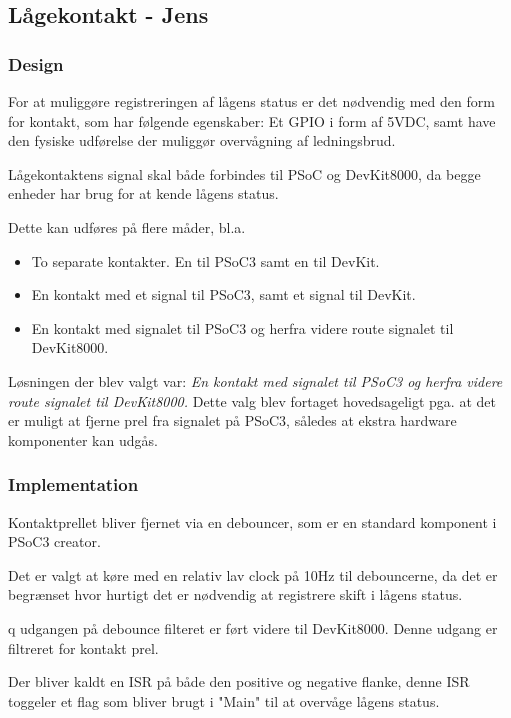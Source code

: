 \subsection{Lågekontakt - Jens}
\subsubsection{Design}

For at muliggøre registreringen af lågens status er det nødvendig med den form for kontakt, som har følgende egenskaber: Et GPIO i form af 5VDC, samt have den fysiske udførelse der muliggør overvågning af ledningsbrud.

Lågekontaktens signal skal både forbindes til PSoC og DevKit8000, da begge enheder har brug for at kende lågens status.

Dette kan udføres på flere måder, bl.a.
\begin{itemize}
 \item To separate kontakter. En til PSoC3 samt en til DevKit.
 \item En kontakt med et signal til PSoC3, samt et signal til DevKit.
 \item En kontakt med signalet til PSoC3 og herfra videre route signalet til DevKit8000.
\end{itemize}

Løsningen der blev valgt var: \textit{En kontakt med signalet til PSoC3 og herfra videre route signalet til DevKit8000.} 
Dette valg blev fortaget hovedsageligt pga. at det er muligt at fjerne prel fra signalet på PSoC3, således at ekstra hardware komponenter kan udgås.  

\subsubsection{Implementation}

Kontaktprellet bliver fjernet via en debouncer, som er en standard komponent i PSoC3 creator. 

Det er valgt at køre med en relativ lav clock på 10Hz til debouncerne, da det er begrænset hvor hurtigt det er nødvendig at registrere skift i lågens status. 

q udgangen på debounce filteret er ført videre til DevKit8000. Denne udgang er filtreret for kontakt prel. 

Der bliver kaldt en ISR på både den positive og negative flanke, denne ISR toggeler et flag som bliver brugt i "Main" til at overvåge lågens status. 